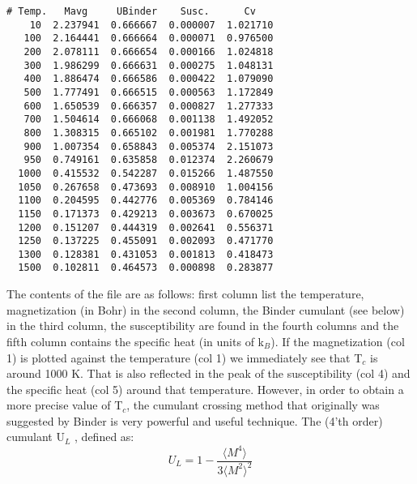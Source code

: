 \documentclass[11pt,fleqn,a4]{book} %
\begin{document}
\begin{fBox} 
\begin{Verbatim}
# Temp.   Mavg     UBinder    Susc.      Cv
    10  2.237941  0.666667  0.000007  1.021710
   100  2.164441  0.666664  0.000071  0.976500
   200  2.078111  0.666654  0.000166  1.024818
   300  1.986299  0.666631  0.000275  1.048131
   400  1.886474  0.666586  0.000422  1.079090
   500  1.777491  0.666515  0.000563  1.172849
   600  1.650539  0.666357  0.000827  1.277333
   700  1.504614  0.666068  0.001138  1.492052
   800  1.308315  0.665102  0.001981  1.770288
   900  1.007354  0.658843  0.005374  2.151073
   950  0.749161  0.635858  0.012374  2.260679
  1000  0.415532  0.542287  0.015266  1.487550
  1050  0.267658  0.473693  0.008910  1.004156
  1100  0.204595  0.442776  0.005369  0.784146
  1150  0.171373  0.429213  0.003673  0.670025
  1200  0.151207  0.444319  0.002641  0.556371
  1250  0.137225  0.455091  0.002093  0.471770
  1300  0.128381  0.431053  0.001813  0.418473
  1500  0.102811  0.464573  0.000898  0.283877
\end{Verbatim}
\end{fBox}
The contents of the file are as follows: first column list the temperature, magnetization (in Bohr) in the second column, the Binder cumulant (see below) in the third column, the susceptibility are found in the fourth columns and the fifth column contains the specific heat (in units of k$_B$). If the magnetization (col 1) is plotted against the temperature (col 1) we immediately see that T$_c$ is around 1000 K. That is also reflected in the peak of the susceptibility (col 4) and the specific heat (col 5) around that temperature. However, in order to obtain a more precise value of T$_c$, the cumulant crossing method that originally was suggested by Binder is very powerful and useful technique. The (4'th order) cumulant U$_L$ , defined as:
\begin{equation}
U_L = 1 -\frac{\langle M^4 \rangle}{3 \langle M^2 \rangle ^2 }
\end{equation}
\end{document}
